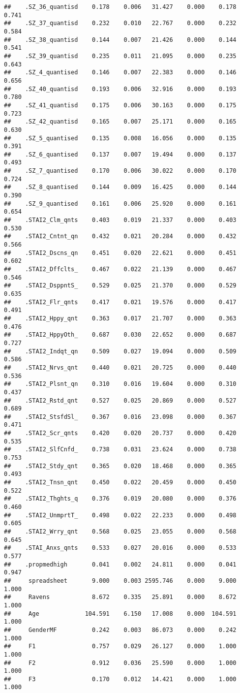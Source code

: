 \documentclass[]{article}
\begin{document}
\begin{verbatim}
##    .SZ_36_quantisd    0.178    0.006   31.427    0.000    0.178    0.741
##    .SZ_37_quantisd    0.232    0.010   22.767    0.000    0.232    0.584
##    .SZ_38_quantisd    0.144    0.007   21.426    0.000    0.144    0.541
##    .SZ_39_quantisd    0.235    0.011   21.095    0.000    0.235    0.643
##    .SZ_4_quantised    0.146    0.007   22.383    0.000    0.146    0.656
##    .SZ_40_quantisd    0.193    0.006   32.916    0.000    0.193    0.780
##    .SZ_41_quantisd    0.175    0.006   30.163    0.000    0.175    0.723
##    .SZ_42_quantisd    0.165    0.007   25.171    0.000    0.165    0.630
##    .SZ_5_quantised    0.135    0.008   16.056    0.000    0.135    0.391
##    .SZ_6_quantised    0.137    0.007   19.494    0.000    0.137    0.493
##    .SZ_7_quantised    0.170    0.006   30.022    0.000    0.170    0.724
##    .SZ_8_quantised    0.144    0.009   16.425    0.000    0.144    0.390
##    .SZ_9_quantised    0.161    0.006   25.920    0.000    0.161    0.654
##    .STAI2_Clm_qnts    0.403    0.019   21.337    0.000    0.403    0.530
##    .STAI2_Cntnt_qn    0.432    0.021   20.284    0.000    0.432    0.566
##    .STAI2_Dscns_qn    0.451    0.020   22.621    0.000    0.451    0.602
##    .STAI2_Dffclts_    0.467    0.022   21.139    0.000    0.467    0.546
##    .STAI2_DsppntS_    0.529    0.025   21.370    0.000    0.529    0.635
##    .STAI2_Flr_qnts    0.417    0.021   19.576    0.000    0.417    0.491
##    .STAI2_Hppy_qnt    0.363    0.017   21.707    0.000    0.363    0.476
##    .STAI2_HppyOth_    0.687    0.030   22.652    0.000    0.687    0.727
##    .STAI2_Indqt_qn    0.509    0.027   19.094    0.000    0.509    0.586
##    .STAI2_Nrvs_qnt    0.440    0.021   20.725    0.000    0.440    0.536
##    .STAI2_Plsnt_qn    0.310    0.016   19.604    0.000    0.310    0.437
##    .STAI2_Rstd_qnt    0.527    0.025   20.869    0.000    0.527    0.689
##    .STAI2_StsfdSl_    0.367    0.016   23.098    0.000    0.367    0.471
##    .STAI2_Scr_qnts    0.420    0.020   20.737    0.000    0.420    0.535
##    .STAI2_SlfCnfd_    0.738    0.031   23.624    0.000    0.738    0.753
##    .STAI2_Stdy_qnt    0.365    0.020   18.468    0.000    0.365    0.493
##    .STAI2_Tnsn_qnt    0.450    0.022   20.459    0.000    0.450    0.522
##    .STAI2_Thghts_q    0.376    0.019   20.080    0.000    0.376    0.460
##    .STAI2_UnmprtT_    0.498    0.022   22.233    0.000    0.498    0.605
##    .STAI2_Wrry_qnt    0.568    0.025   23.055    0.000    0.568    0.645
##    .STAI_Anxs_qnts    0.533    0.027   20.016    0.000    0.533    0.577
##    .propmedhigh       0.041    0.002   24.811    0.000    0.041    0.947
##     spreadsheet       9.000    0.003 2595.746    0.000    9.000    1.000
##     Ravens            8.672    0.335   25.891    0.000    8.672    1.000
##     Age             104.591    6.150   17.008    0.000  104.591    1.000
##     GenderMF          0.242    0.003   86.073    0.000    0.242    1.000
##     F1                0.757    0.029   26.127    0.000    1.000    1.000
##     F2                0.912    0.036   25.590    0.000    1.000    1.000
##     F3                0.170    0.012   14.421    0.000    1.000    1.000
\end{verbatim}
\end{document}
